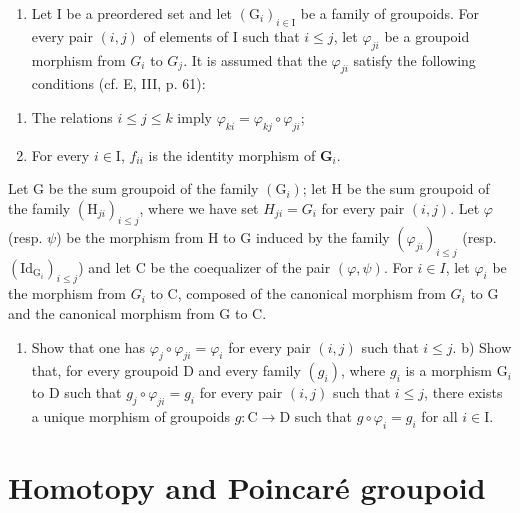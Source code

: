 \begin{enumerate}
\def\labelenumi{\arabic{enumi})}
\setcounter{enumi}{2}
\tightlist
\item
  Let I be a preordered set and let \((\mathrm{G}_{i})_{i\in\mathrm{I}}\) be a family of groupoids. For every pair \((i,j)\) of elements of I such that \(i\leqslant j\), let \(\varphi_{ji}\) be a groupoid morphism from \(G_{i}\) to \(G_{j}\). It is assumed that the \(\varphi_{ji}\) satisfy the following conditions (cf. E, III, p. 61):
\end{enumerate}

\begin{enumerate}
\def\labelenumi{(\roman{enumi})}
\item
  The relations \(i \leqslant j \leqslant k\) imply \(\varphi_{ki} = \varphi_{kj} \circ \varphi_{ji}\);
\item
  For every \(i \in \mathrm{I}\), \(f_{ii}\) is the identity morphism of \(\mathbf{G}_i\).
\end{enumerate}

Let G be the sum groupoid of the family \((\mathrm{G}_{i})\); let H be the sum groupoid of the family \((\mathrm{H}_{ji})_{i\leqslant j}\), where we have set \(H_{ji} = G_{i}\) for every pair \((i,j)\). Let \(\varphi\) (resp. \(\psi\)) be the morphism from H to G induced by the family \((\varphi_{ji})_{i\leqslant j}\) (resp. \((\mathrm{Id}_{\mathrm{G}_{i}})_{i\leqslant j}\)) and let C be the coequalizer of the pair \((\varphi,\psi)\). For \(i \in I\), let \(\varphi_{i}\) be the morphism from \(G_{i}\) to C, composed of the canonical morphism from \(G_{i}\) to G and the canonical morphism from G to C.

\begin{enumerate}
\def\labelenumi{\alph{enumi})}
\tightlist
\item
  Show that one has \(\varphi_j \circ \varphi_{ji} = \varphi_i\) for every pair \((i,j)\) such that \(i \leqslant j\). b) Show that, for every groupoid D and every family \((g_i)\), where \(g_i\) is a morphism \(\mathrm{G}_i\) to D such that \(g_j \circ \varphi_{ji} = g_i\) for every pair \((i,j)\) such that \(i \leqslant j\), there exists a unique morphism of groupoids \(g: \mathrm{C} \to \mathrm{D}\) such that \(g \circ \varphi_i = g_i\) for all \(i \in \mathrm{I}\).
\end{enumerate}

\chapter{Homotopy and Poincaré groupoid}

